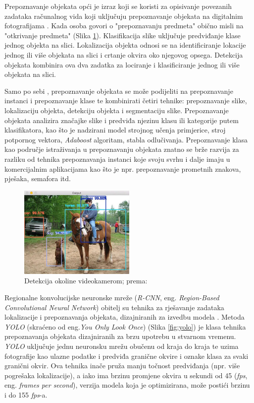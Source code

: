 \documentclass[]{foi} %
\begin{document}
Prepoznavanje objekata opći je izraz koji se koristi za opisivanje povezanih zadataka računalnog vida koji uključuju prepoznavanje objekata na digitalnim fotografijama \cite[str. 349, 350]{szeliskicvaa}.
Kada osoba govori o "prepoznavanju predmeta" obično misli na "otkrivanje predmeta" (Slika \ref{fig:objekti}).
Klasifikacija slike uključuje predviđanje klase jednog objekta na slici. Lokalizacija objekta odnosi se na identificiranje lokacije jednog ili više objekata na slici i crtanje okvira oko njegovog opsega. Detekcija objekata kombinira ova dva zadatka za lociranje i klasificiranje jednog ili više objekata na slici.

Samo po sebi \cite[str. 346, 347, 349]{szeliskicvaa}, prepoznavanje objekata se može podijeliti na prepoznavanje instanci i prepoznavanje klase te kombinirati četiri tehnike: prepoznavanje slike, lokalizaciju objekta, detekciju objekta i segmentaciju slike. Prepoznavanje objekata analizira značajke slike i predviđa njezinu klasu ili kategorije putem klasifikatora, kao što je nadzirani model strojnog učenja primjerice, stroj potpornog vektora, \textit{Adaboost} algoritam, stabla odlučivanja. Prepoznavanje klasa kao područje istraživanja u prepoznavanju objekata znatno se brže razvija za razliku od tehnika prepoznavanja instanci koje svoju svrhu i dalje imaju u komercijalnim aplikacijama kao što je npr. prepoznavanje prometnih znakova, pješaka, semafora itd.

\begin{figure}[!ht]
    \centering
    \includegraphics[width=0.5\textwidth]{slike/objekti.png}
    \caption{Detekcija okoline videokamerom; prema: \cite{szeliskicvaa}}
    \label{fig:objekti}
\end{figure}

\newpage
Regionalne konvolucijske neuronske mreže (\textit{R-CNN}, eng. \textit{Region-Based Convolutional Neural Network}) obitelj su tehnika za rješavanje zadataka lokalizacije i prepoznavanja objekata, dizajniranih za izvedbu modela \cite[str. 383, 385]{szeliskicvaa}. Metoda \textit{YOLO} (skraćeno od eng.\textit{You Only Look Once}) (Slika \ref{fig:yolo}) je klasa tehnika prepoznavanja objekata dizajniranih za brzu upotrebu u stvarnom vremenu. \textit{YOLO} \cite[str. 385]{szeliskicvaa} uključuje jednu neuronsku mrežu obučenu od kraja do kraja te uzima fotografije kao ulazne podatke i predviđa granične okvire i oznake klasa za svaki granični okvir. Ova tehnika inače pruža manju točnost predviđanja (npr. više pogrešaka lokalizacije), a iako ima brzinu promjene okvira u sekundi od 45 (\textit{fps}, eng. \textit{frames per second}), verzija modela koja je optimizirana, može postići brzinu i do 155 \textit{fps}-a.
\end{document}
